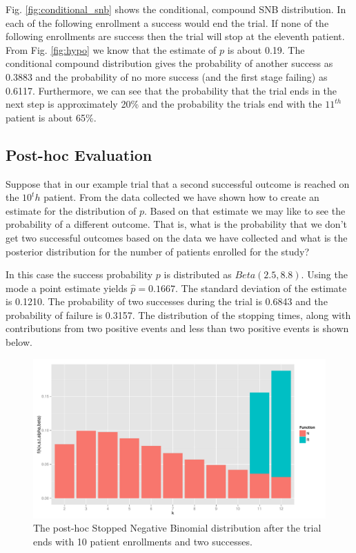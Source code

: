 \documentclass[12pt]{article}         %
\begin{document}
Fig. \ref{fig:conditional_snb} shows the conditional, compound SNB distribution. In each of the following enrollment a success would end the trial. If none of the following enrollments are success then the trial will stop at the eleventh patient. From Fig. \ref{fig:hypo} we know that the estimate of $p$ is about 0.19. The conditional compound distribution gives the probability of another success as 0.3883 and the probability of no more success (and the first stage failing) as 0.6117. Furthermore, we can see that the probability that the trial ends in the next step is approximately 20\% and the probability the trials end with the $11^{th}$ patient is about 65\%.

\subsection{Post-hoc Evaluation}

Suppose that in our example trial that a second successful outcome is reached on the $10^th$ patient. From the data collected we have shown how to create an estimate for the distribution of $p$. Based on that estimate we may like to see the probability of a different outcome. That is, what is the probability that we don't get two successful outcomes based on the data we have collected and what is the posterior distribution for the number of patients enrolled for the study?

In this case the success probability $p$ is distributed as $Beta(2.5, 8.8)$. Using the mode a point estimate yields $\hat{p} = 0.1667$. The standard deviation of the estimate is 0.1210. The probability of two successes during the trial is 0.6843 and the probability of failure is 0.3157. The distribution of the stopping times, along with contributions from two positive events and less than two positive events is shown below.

\begin{figure}[ht]
\includegraphics[width=\textwidth]{post_hoc.pdf}
\caption{
The post-hoc Stopped Negative Binomial distribution after the trial ends with 10 patient enrollments and two successes.
}
\label{fig:post_hoc}
\end{figure}
\end{document}

